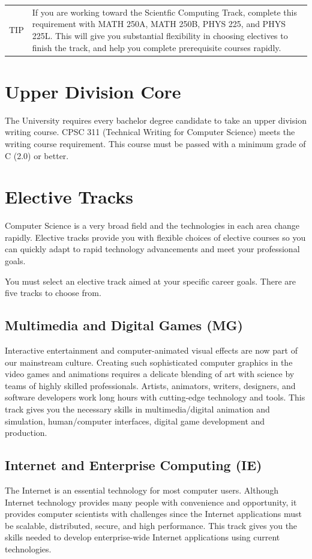 \documentclass{book}
\newenvironment{tip}
    {\tcolorbox \begin{tabular}{m{.5in} m{5in}} \Large{TIP} & }
    {\end{tabular} \endtcolorbox}
\begin{document}
\begin{tip}
If you are working toward the Scientfic Computing Track, complete this requirement with  MATH 250A, MATH 250B, PHYS 225, and PHYS 225L. This will give you substantial flexibility in choosing electives to finish the track, and help you complete prerequisite courses rapidly.
\end{tip}

\section{Upper Division Core}

The University requires every bachelor degree candidate to take an upper division writing course. CPSC 311 (Technical Writing for Computer Science) meets the writing course requirement. This course must be passed with a minimum grade of C (2.0) or better.

\section{Elective Tracks}
 
Computer Science is a very broad field and the technologies in each area change rapidly. Elective tracks provide you with flexible choices of elective courses so you can quickly adapt to rapid technology advancements and meet your professional goals.

You must select an elective track aimed at your specific career goals. There are five tracks to choose from.

\subsection{Multimedia and Digital Games (MG)}
Interactive entertainment and computer-animated visual effects are now part of our mainstream culture. Creating such sophisticated computer graphics in the video games and animations requires a delicate blending of art with science by teams of highly skilled professionals. Artists, animators, writers, designers, and software developers work long hours with cutting-edge technology and tools. This track gives you the necessary skills in multimedia/digital animation and simulation, human/computer interfaces, digital game development and production.

\subsection{Internet and Enterprise Computing (IE)}
The Internet is an essential technology for most computer users. Although Internet technology provides many people with convenience and opportunity, it provides computer scientists with challenges since the Internet applications must be scalable, distributed, secure, and high performance. This track gives you the skills needed to develop enterprise-wide Internet applications using current technologies.
\end{document}

